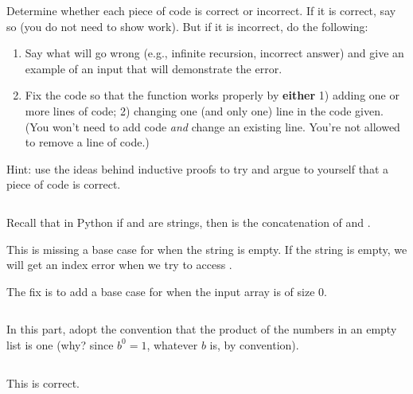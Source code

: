\begin{prob}
    Determine whether each piece of code is correct or
    incorrect. If it is correct, say so (you do not need to show work). But if it
    is incorrect, do the following:
    
    \begin{enumerate}
        \item Say what will go wrong (e.g., infinite recursion, incorrect
            answer) and give an example of an input that will demonstrate the
            error.
        \item Fix the code so that the function works properly by
            \textbf{either} 1) adding one or more lines of code; 2) changing
            one (and only one) line in the code given.  (You won't need to add
            code \emph{and} change an existing line. You're not allowed to
            remove a line of code.)
    \end{enumerate}

    Hint: use the ideas behind inductive proofs to try and argue to yourself that a piece
    of code is correct.

    \begin{subprobset}
        \begin{subprob}
            \inputminted{python}{\thisdir/include/part_a.py}
            Recall that in Python if  and  are strings, then 
            is the concatenation of  and .
            \begin{soln}
                This is missing a base case for when the string is empty. If the string is
                empty, we will get an index error when we try to access .

                The fix is to add a base case for when the input array is of size 0.
                \inputminted{python}{\thisdir/include-solution/part_a.py}
            \end{soln}
        \end{subprob}

        \begin{subprob}
            In this part, adopt the convention that the product of the numbers in an empty
            list is one 
            (why? since $b^0 = 1$, whatever $b$ is, by convention).
            \inputminted{python}{\thisdir/include/part_b.py}
            \begin{soln}
                This is correct.
            \end{soln}
        \end{subprob}


\end{subprobset}
\end{prob}
